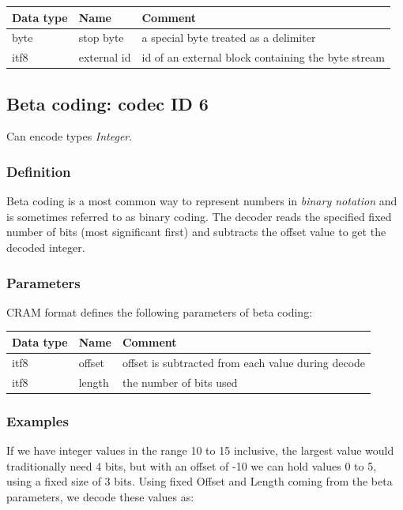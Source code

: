 \documentclass[a4paper]{article}
\begin{document}
\begin{tabular}{|>{\raggedright}p{100pt}|>{\raggedright}p{100pt}|>{\raggedright}p{230pt}|}
\hline
\textbf{Data type} & \textbf{Name} & \textbf{Comment}
\tabularnewline
\hline
byte & stop byte & a special byte treated as a delimiter\tabularnewline
\hline
itf8 & external id & id of an external block containing the byte stream\tabularnewline
\hline
\end{tabular}

\subsection{Beta coding: codec ID 6}

Can encode types \textit{Integer}.

\subsubsection*{Definition}

Beta coding is a most common way to represent numbers in \emph{binary notation} and is sometimes referred to as binary coding.
The decoder reads the specified fixed number of bits (most significant first) and subtracts the offset value to get the decoded integer.

\subsubsection*{Parameters}

CRAM format defines the following parameters of beta coding: 

\begin{tabular}{|>{\raggedright}p{144pt}|>{\raggedright}p{144pt}|>{\raggedright}p{144pt}|}
\hline
\textbf{Data type} & \textbf{Name} & \textbf{Comment}\tabularnewline
\hline
itf8 & offset & offset is subtracted from each value during decode\tabularnewline
\hline
itf8 & length & the number of bits used\tabularnewline
\hline
\end{tabular}

\subsubsection*{Examples}

If we have integer values in the range 10 to 15 inclusive, the largest value would traditionally need 4 bits, but with an offset of -10 we can hold values 0 to 5, using a fixed size of 3 bits.
Using fixed Offset and Length coming from the beta parameters, we decode these values as:
\end{document}
